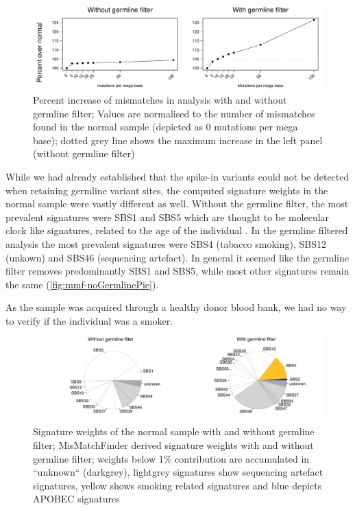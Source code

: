 \begin{figure}[ht]
\centering
\includegraphics[width=.99\linewidth]{Figures/MisMatchFinder/spikeInPercentage.pdf}
\caption[Percent increase of mismatches in analysis with and without germline filter]{Percent increase of mismatches in analysis with and without germline filter; Values are normalised to the number of mismatches found in the normal sample (depicted as \num{0} mutations per mega base); dotted grey line shows the maximum increase in the left panel (without germline filter)}\label{fig:mmf-percentIncrease}
\end{figure}

While we had already established that the spike-in variants could not  be detected when retaining germline variant sites, the computed signature weights in the normal sample were vastly different as well. Without the germline filter, the most prevalent signatures were SBS1 and SBS5 which are thought to be molecular clock like signatures, related to the age of the individual \cite{Alexandrov2020}. In the germline filtered analysis the most prevalent signatures were SBS4 (tabacco smoking), SBS12 (unkown) and SBS46 (sequencing artefact). In general it seemed like the germline filter removes predominantly SBS1 and SBS5, while most other signatures remain the same (\autoref{fig:mmf-noGermlinePie}).

As the sample was acquired through a healthy donor blood bank, we had no way to verify if the individual was a smoker.

\begin{figure}[ht]
\centering
\includegraphics[width=.99\linewidth]{Figures/MisMatchFinder/noGermlineFilterSignaturesPieChart.pdf}
\caption[Signature weights of the normal sample with and without germline filter]{Signature weights of the normal sample with and without germline filter; MisMatchFinder derived signature weights with and without germline filter; weights below 1\% contribution are accumulated in ``unknown`` (darkgrey), lightgrey signatures show sequencing artefact signatures, yellow shows smoking related signatures and blue depicts APOBEC signatures}\label{fig:mmf-noGermlinePie}
\end{figure}
 
